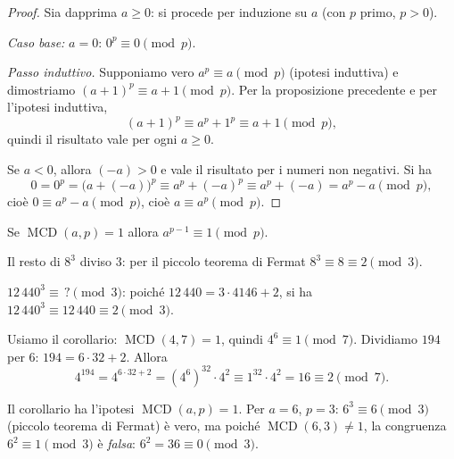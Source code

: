 \documentclass[11pt,a4paper]{article}
\begin{document}
\begin{proof}
Sia dapprima $a \ge 0$: si procede per induzione su $a$ (con $p$ primo, $p > 0$).

\emph{Caso base:} $a = 0$: $0^p \equiv 0 \pmod p$.

\emph{Passo induttivo.} Supponiamo vero $a^p \equiv a \pmod p$ (ipotesi induttiva) e dimostriamo $(a+1)^p \equiv a + 1 \pmod p$. Per la proposizione precedente e per l'ipotesi induttiva,
\[
  (a + 1)^p \equiv a^p + 1^p \equiv a + 1 \pmod p ,
\]
quindi il risultato vale per ogni $a \ge 0$.

Se $a < 0$, allora $(-a) > 0$ e vale il risultato per i numeri non negativi. Si ha
\[
  0 = 0^p = \big(a + (-a)\big)^p \equiv a^p + (-a)^p \equiv a^p + (-a) = a^p - a \pmod p ,
\]
cioè $0 \equiv a^p - a \pmod p$, cioè $a \equiv a^p \pmod p$.
\end{proof}

\begin{teorema}[Corollario]
Se $\operatorname{MCD}(a, p) = 1$ allora $a^{p-1} \equiv 1 \pmod p$.
\end{teorema}

\begin{esempio}
Il resto di $8^3$ diviso $3$: per il piccolo teorema di Fermat $8^3 \equiv 8 \equiv 2 \pmod 3$.

$12\,440^3 \equiv\, ?\pmod 3$: poiché $12\,440 = 3\cdot 4146 + 2$, si ha $12\,440^3 \equiv 12\,440 \equiv 2 \pmod 3$.
\end{esempio}

\begin{esempio}[$4^{194} \bmod 7$]
Usiamo il corollario: $\operatorname{MCD}(4, 7) = 1$, quindi $4^6 \equiv 1 \pmod 7$. Dividiamo $194$ per $6$: $194 = 6\cdot 32 + 2$. Allora
\[
  4^{194} = 4^{6\cdot 32 + 2} = \left(4^6\right)^{32}\cdot 4^2 \equiv 1^{32}\cdot 4^2 = 16 \equiv 2 \pmod 7 .
\]
\end{esempio}

\begin{osservazione}
Il corollario ha l'ipotesi $\operatorname{MCD}(a, p) = 1$. Per $a = 6$, $p = 3$: $6^3 \equiv 6 \pmod 3$ (piccolo teorema di Fermat) è vero, ma poiché $\operatorname{MCD}(6, 3) \neq 1$, la congruenza $6^2 \equiv 1 \pmod 3$ è \emph{falsa}: $6^2 = 36 \equiv 0 \pmod 3$.
\end{osservazione}
\end{document}
